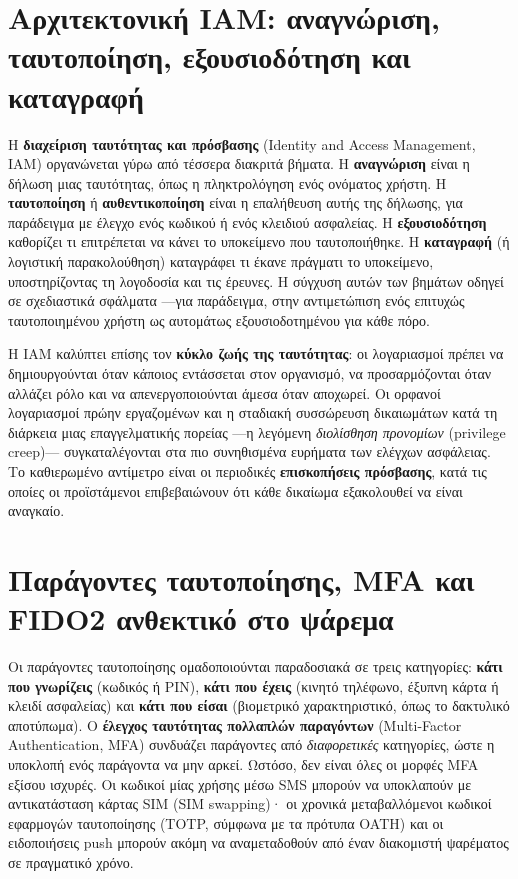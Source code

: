 \section{Αρχιτεκτονική IAM: αναγνώριση, ταυτοποίηση, εξουσιοδότηση και καταγραφή}\label{sec:8.1}
Η \textbf{διαχείριση ταυτότητας και πρόσβασης} (Identity and Access Management, IAM) οργανώνεται γύρω από τέσσερα διακριτά βήματα. Η \textbf{αναγνώριση} είναι η δήλωση μιας ταυτότητας, όπως η πληκτρολόγηση ενός ονόματος χρήστη. Η \textbf{ταυτοποίηση} ή \textbf{αυθεντικοποίηση} είναι η επαλήθευση αυτής της δήλωσης, για παράδειγμα με έλεγχο ενός κωδικού ή ενός κλειδιού ασφαλείας. Η \textbf{εξουσιοδότηση} καθορίζει τι επιτρέπεται να κάνει το υποκείμενο που ταυτοποιήθηκε. Η \textbf{καταγραφή} (ή λογιστική παρακολούθηση) καταγράφει τι έκανε πράγματι το υποκείμενο, υποστηρίζοντας τη λογοδοσία και τις έρευνες. Η σύγχυση αυτών των βημάτων οδηγεί σε σχεδιαστικά σφάλματα —για παράδειγμα, στην αντιμετώπιση ενός επιτυχώς ταυτοποιημένου χρήστη ως αυτομάτως εξουσιοδοτημένου για κάθε πόρο.

Η IAM καλύπτει επίσης τον \textbf{κύκλο ζωής της ταυτότητας}: οι λογαριασμοί πρέπει να δημιουργούνται όταν κάποιος εντάσσεται στον οργανισμό, να προσαρμόζονται όταν αλλάζει ρόλο και να απενεργοποιούνται άμεσα όταν αποχωρεί. Οι ορφανοί λογαριασμοί πρώην εργαζομένων και η σταδιακή συσσώρευση δικαιωμάτων κατά τη διάρκεια μιας επαγγελματικής πορείας —η λεγόμενη \emph{διολίσθηση προνομίων} (privilege creep)— συγκαταλέγονται στα πιο συνηθισμένα ευρήματα των ελέγχων ασφάλειας. Το καθιερωμένο αντίμετρο είναι οι περιοδικές \textbf{επισκοπήσεις πρόσβασης}, κατά τις οποίες οι προϊστάμενοι επιβεβαιώνουν ότι κάθε δικαίωμα εξακολουθεί να είναι αναγκαίο.

\section{Παράγοντες ταυτοποίησης, MFA και FIDO2 ανθεκτικό στο ψάρεμα}\label{sec:8.2}
Οι παράγοντες ταυτοποίησης ομαδοποιούνται παραδοσιακά σε τρεις κατηγορίες: \textbf{κάτι που γνωρίζεις} (κωδικός ή PIN), \textbf{κάτι που έχεις} (κινητό τηλέφωνο, έξυπνη κάρτα ή κλειδί ασφαλείας) και \textbf{κάτι που είσαι} (βιομετρικό χαρακτηριστικό, όπως το δακτυλικό αποτύπωμα). Ο \textbf{έλεγχος ταυτότητας πολλαπλών παραγόντων} (Multi-Factor Authentication, MFA) συνδυάζει παράγοντες από \emph{διαφορετικές} κατηγορίες, ώστε η υποκλοπή ενός παράγοντα να μην αρκεί. Ωστόσο, δεν είναι όλες οι μορφές MFA εξίσου ισχυρές. Οι κωδικοί μίας χρήσης μέσω SMS μπορούν να υποκλαπούν με αντικατάσταση κάρτας SIM (SIM swapping)· οι χρονικά μεταβαλλόμενοι κωδικοί εφαρμογών ταυτοποίησης (TOTP, σύμφωνα με τα πρότυπα OATH) και οι ειδοποιήσεις push μπορούν ακόμη να αναμεταδοθούν από έναν διακομιστή ψαρέματος σε πραγματικό χρόνο.

